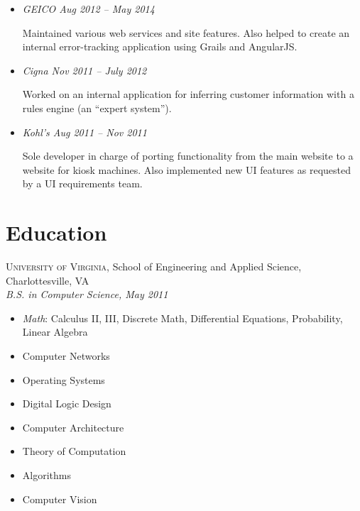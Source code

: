 \documentclass[12pt]{article}
\begin{document}
  \begin{itemize}

  \item \textit{GEICO \hfill Aug 2012 -- May 2014}

    Maintained various web services and site features. Also helped to create an
    internal error-tracking application using Grails and AngularJS.

        
     

  \item \textit{Cigna \hfill Nov 2011 -- July 2012}

    Worked on an internal application for inferring customer information with a
    rules engine (an ``expert system'').

     

  \item \textit{Kohl's \hfill Aug 2011 -- Nov 2011}

    Sole developer in charge of porting functionality from the main website to a
    website for kiosk machines. Also implemented new UI features as requested by
    a UI requirements team.

     

  \end{itemize}


\section*{Education}

  \textsc{University of Virginia}, School of Engineering and Applied Science,
  Charlottesville, VA \\
  \textit{B.S. in Computer Science, May 2011}

  \begin{multicols}{3}
    \raggedright

    \begin{itemize}
    \item \textit{Math}: Calculus II, III, Discrete Math, Differential
      Equations, Probability, Linear Algebra
    \item Computer Networks
    \item Operating Systems
    \item Digital Logic Design
    \item Computer Architecture
    \item Theory of Computation
    \item Algorithms
    \item Computer Vision
    \end{itemize}
  \end{multicols}
\end{document}
